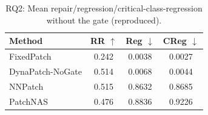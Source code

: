\documentclass{article}
\begin{document}
\begin{table}[h]
\centering
\caption{RQ2: Mean repair/regression/critical-class-regression without the gate (reproduced).}
\label{tab:repro_rq2_ungated_summary}
\small
\begin{tabular}{lccc}
\toprule
Method & RR $\uparrow$ & Reg $\downarrow$ & CReg $\downarrow$ \\
\midrule
FixedPatch & 0.242 & 0.0038 & 0.0027 \\
DynaPatch-NoGate & 0.514 & 0.0068 & 0.0044 \\
NNPatch & 0.515 & 0.8632 & 0.8685 \\
PatchNAS & 0.476 & 0.8836 & 0.9226 \\
\bottomrule
\end{tabular}
\end{table}
\end{document}
